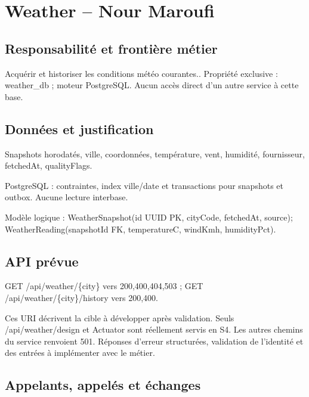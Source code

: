 \documentclass[10pt,a4paper]{article}
\begin{document}
\section*{Weather  --  Nour Maroufi}

\subsection*{Responsabilité et frontière métier}

Acquérir et historiser les conditions météo courantes.. Propriété exclusive : weather\_db ; moteur PostgreSQL. Aucun accès direct d'un autre service à cette base.\par

\subsection*{Données et justification}

Snapshots horodatés, ville, coordonnées, température, vent, humidité, fournisseur, fetchedAt, qualityFlags.\par

PostgreSQL : contraintes, index ville/date et transactions pour snapshots et outbox. Aucune lecture interbase.\par

Modèle logique : WeatherSnapshot(id UUID PK, cityCode, fetchedAt, source); WeatherReading(snapshotId FK, temperatureC, windKmh, humidityPct).\par

\subsection*{API prévue}

GET /api/weather/\{city\}  vers  200,400,404,503 ; GET /api/weather/\{city\}/history  vers  200,400.\par

Ces URI décrivent la cible à développer après validation. Seuls /api/weather/design et Actuator sont réellement servis en S4. Les autres chemins du service renvoient 501. Réponses d'erreur structurées, validation de l'identité et des entrées à implémenter avec le métier.\par

\subsection*{Appelants, appelés et échanges}
\end{document}
